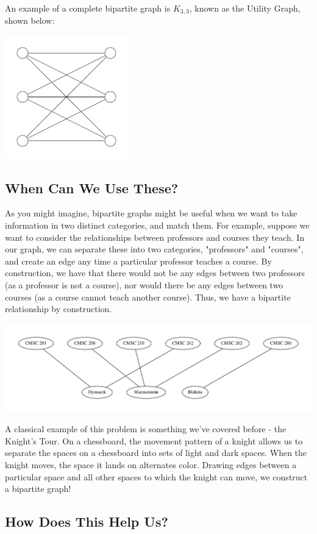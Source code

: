 An example of a complete bipartite graph is $K_{3,3}$, known as the Utility Graph, shown below:

\begin{center}
    \includegraphics[width=0.4\textwidth]{Project3/Bipartite/k33.pdf}
\end{center}

\subsection{When Can We Use These?}
As you might imagine, bipartite graphs might be useful when we want to take information in two distinct categories, and match them. For example, suppose we want to consider the relationships between professors and courses they teach. In our graph, we can separate these into two categories, "professors" and "courses", and create an edge any time a particular professor teaches a course. By construction, we have that there would not be any edges between two professors (as a professor is not a course), nor would there be any edges between two courses (as a course cannot teach another course). Thus, we have a bipartite relationship by construction.

\begin{center}
    \includegraphics[width=\textwidth]{Project3/Bipartite/boxed.pdf}
\end{center}

A classical example of this problem is something we've covered before - the Knight's Tour. On a chessboard, the movement pattern of a knight allows us to separate the spaces on a chessboard into sets of light and dark spaces. When the knight moves, the space it lands on alternates color. Drawing edges between a particular space and all other spaces to which the knight can move, we construct a bipartite graph!

\subsection{How Does This Help Us?}
